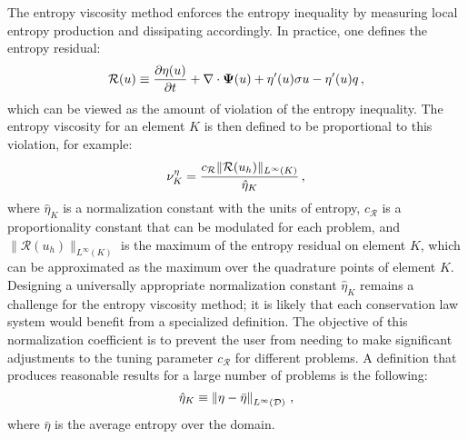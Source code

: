The entropy viscosity method enforces the entropy inequality by measuring
local entropy production and dissipating accordingly. In practice, one
defines the entropy residual:
\begin{equation}
  \mathcal{R}(u) \equiv \frac{\partial \eta(u)}{\partial t} + \nabla\cdot\mathbf{\Psi}(u)
    + \eta'(u)\sigma u - \eta'(u)q \,,
\end{equation}
which can be viewed as the amount of violation of the entropy inequality.
The entropy viscosity for an element $K$ is then defined to be proportional
to this violation, for example:
\begin{equation}
  \nu^\eta_K = \frac{c_\mathcal{R}\|\mathcal{R}(u_h)\|_{L^\infty(K)}}
    {\hat{\eta}_K}
    \,,
\end{equation}
where $\hat{\eta}_K$ is a normalization constant with the units of entropy,
$c_\mathcal{R}$ is a proportionality constant that can be modulated for
each problem, and $\|\mathcal{R}(u_h)\|_{L^\infty(K)}$ is the maximum of the
entropy residual on element $K$, which can be approximated as the maximum over
the quadrature points of element $K$.
Designing a universally appropriate normalization constant $\hat{\eta}_K$ remains
a challenge for the entropy viscosity method; it is likely that each conservation
law system would benefit from a specialized definition. The objective of this
normalization coefficient is to prevent the user from needing to make significant
adjustments to the tuning parameter $c_\mathcal{R}$ for different problems.
A definition that produces reasonable results for a large number of problems
is the following:
\begin{equation}
  \hat{\eta}_K \equiv \left\|\eta-\bar{\eta}\right\|_{L^\infty(\mathcal{D})} \,,
\end{equation}
where $\bar{\eta}$ is the average entropy over the domain.

